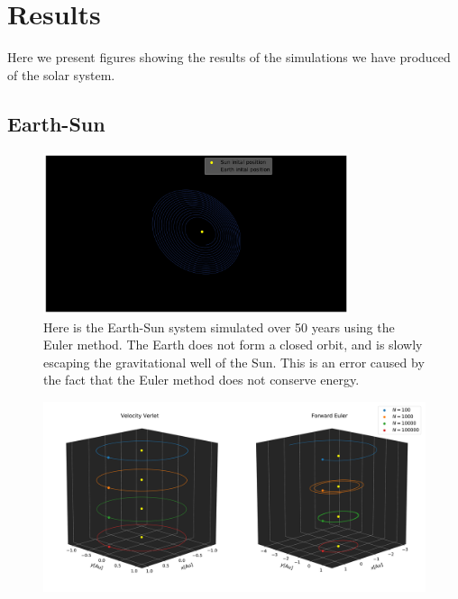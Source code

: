\documentclass[../main.tex]{subfiles}
\begin{document}
\section{Results}\label{sec:results}

Here we present figures showing the results of the simulations we have produced of the solar system. 

\subsection{Earth-Sun}

\begin{figure}[htb!]
    \centering
    \includegraphics[trim=15cm 5.cm 11cm 0.cm, clip,width=0.8\textwidth]{../figures/Euler_Earth_Sun.pdf}
    \caption{Here is the Earth-Sun system simulated over 50 years using the Euler method. The Earth does not form a closed orbit, and is slowly escaping the gravitational well of the Sun. This is an error caused by the fact that the Euler method does not conserve energy.}
    \label{fig:earth-sun-euler}
\end{figure}

\begin{figure}[htb!]
    \centering
    \includegraphics[trim=2cm 0.cm 2cm 0.cm, clip,width=\textwidth]{../figures/stability.pdf}
    \caption{}
    \label{fig:earth-sun-verlet-vs-euler}
\end{figure}
\end{document}
